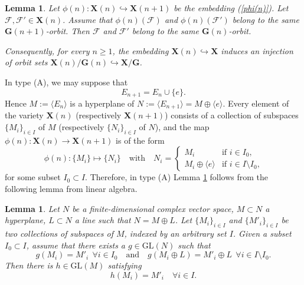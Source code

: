 \documentclass[12pt]{amsart}
\newcommand{\GL}{\mathrm{GL}}
\newcommand{\G}{\mathbf{G}}
\newcommand{\X}{\mathbf{X}}
\newcommand{\Ff}{\mathcal{F}}
\renewcommand{\span}[1]{\langle #1\rangle}
\numberwithin{equation}{section}
\newtheorem{lemma}[theorem]{Lemma}
\theoremstyle{definition}
\begin{document}
\begin{lemma}
\label{L-key}
Let $\phi(n):\X(n)\hookrightarrow\X(n+1)$ be the embedding (\ref{phi(n)}).
Let $\Ff,\Ff'\in\X(n)$. Assume that $\phi(n)(\Ff)$ and $\phi(n)(\Ff')$ belong to the same $\G(n+1)$-orbit. Then $\Ff$ and $\Ff'$ belong to the same $\G(n)$-orbit.

Consequently, for every $n\geq 1$, the embedding $\X(n)\hookrightarrow \X$ induces an injection of orbit sets $\X(n)/\G(n)\hookrightarrow \X/\G$.
\end{lemma} 


In type (A), we may suppose that
\[E_{n+1}=E_n\cup\{e\}.\]
Hence $M:=\span{E_n}$ is a hyperplane of $N:=\span{E_{n+1}}=M\oplus\span{e}$.
Every element of the variety $\X(n)$ (respectively $\X(n+1)$) consists of a collection of subspaces
$\{M_i\}_{i\in I}$ of $M$ (respectively $\{N_i\}_{i\in I}$ of $N$), and the map
$\phi(n):\X(n)\to\X(n+1)$ is of the form
\[
\phi(n):\{M_i\}\mapsto\{N_i\}\quad\mbox{with}\quad N_i=\left\{\begin{array}{ll}
M_i & \mbox{if $i\in I_0$,} \\
M_i\oplus\span{e} & \mbox{if $i\in I\setminus I_0$,}
\end{array}\right.
\]
for some subset $I_0\subset I$.
Therefore, in type (A) Lemma \ref{L-key} follows from the following lemma from linear algebra.


\begin{lemma}
\label{L2}
Let $N$ be a finite-dimensional complex vector space, $M\subset N$ a hyperplane, $L\subset N$ a line such that $N=M\oplus L$.
Let $\{M_i\}_{i\in I}$ and $\{M'_i\}_{i\in I}$ be two collections of subspaces of $M$, indexed by an arbitrary set $I$. Given a subset $I_0\subset I$, assume that there exists a $g\in \GL(N)$ such that
\[g(M_i)=M'_i\ \ \forall i\in I_0\quad\mbox{and}\quad g(M_i\oplus L)=M'_i\oplus L\ \ \forall i\in I\setminus I_0.\]
Then there is $h\in \GL(M)$ satisfying
\[h(M_i)=M'_i\quad \forall i\in I.\]
\end{lemma}
\end{document}
